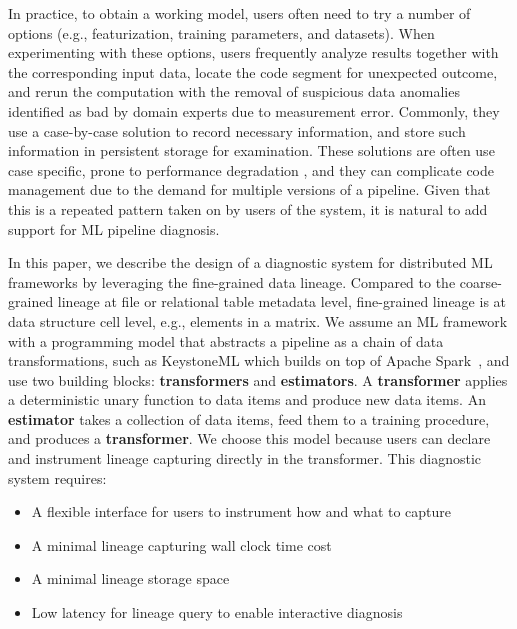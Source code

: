 \documentclass{sig-alternate}
\newenvironment{shortlist}{
        \vspace*{-0.5em}
  \begin{itemize}
  \setlength{\itemsep}{-0.1em}
}{
  \end{itemize}
        \vspace*{-0.5em}
}
\begin{document}
In practice, to obtain a working model, users often need to try a number of options (e.g., featurization, training parameters, and datasets). 
When experimenting with these options, users frequently analyze results together with the corresponding input data,  
locate the code segment for unexpected outcome, and rerun the computation with the removal of suspicious data anomalies
identified as bad by domain experts due to measurement error.
Commonly, they use a case-by-case solution to record necessary information, and store such information in persistent storage for examination.
These solutions are often use case specific, prone to performance degradation , and they can complicate code
management due to the demand for multiple versions of a pipeline.
Given that this is a repeated pattern taken on by users of the system, it is natural to add support 
for ML pipeline diagnosis.

In this paper, we describe the design of a diagnostic system for distributed ML frameworks by leveraging the fine-grained data lineage.
Compared to the coarse-grained lineage at file or relational table metadata level, fine-grained lineage is at data structure cell level, e.g., elements in a matrix. 
We assume an ML framework with a programming model that abstracts a pipeline as a chain of data transformations, such as KeystoneML
which builds on top of Apache Spark~\cite{zaharia12}, and use two building blocks: {\bf transformers} and {\bf estimators}.
A {\bf transformer} applies a deterministic unary function to data items and produce new data items.
An {\bf estimator} takes a collection of data items, feed them to a training procedure,  and produces a {\bf transformer}.
We choose this model because users can declare and instrument lineage capturing directly in the transformer.
This diagnostic system requires:
\begin{shortlist}
\item{} A flexible interface for users to instrument how and what to capture
\item{} A minimal lineage capturing wall clock time cost
\item{} A minimal lineage storage space
\item{} Low latency for lineage query to enable interactive diagnosis
\end{shortlist}
\end{document}
